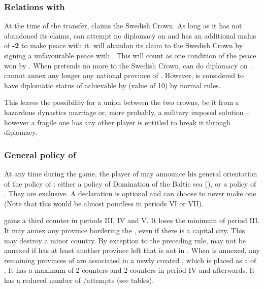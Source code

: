 \subsubsection{Relations with }
\label{chSpecific:Sweden:Denmark}
 At the time of the transfer,
 claims the Swedish Crown. As long as it has not
abandoned its claims, \SUE can attempt no diplomacy on 
and has an additional malus of {\bf -2} to make peace with it.
\aparag {} will abandon its claim to the Swedish Crown by
signing a unfavourable peace with \SUE. This will count as one condition
of the peace won by \SUE.
\bparag When  pretends no more to the Swedish Crown, \SUE
can do diplomacy on . 
\bparag \SUE cannot annex any longer any national province of .
However,  is considered to have diplomatic status of \ANNEXION 
achievable by \SUE (value of 10) by normal rules.
\begin{designnote}
This leaves the possibility for a union between the two crowns, be it from a
hazardous dynastics marriage or, more probably, a military imposed solution 
-- however a fragile one has any other player is entitled to break it through diplomacy.
\end{designnote}
\subsubsection{General policy of }
\aparag At any time during the game, the player of \SUE may announce his
general orientation of the policy of \SUE: either a policy of Domination
of the Baltic sea (), or a policy of
. They are exclusive. A declaration is
optional and \SUE can choose to never make one (Note that this would be
almost pointless in periods VI or VII).

\label{chSpecific:Sweden:DMB}
\bparag \SUE gains a third \ARMY counter in periods III, IV and V. It
loses the minimum \LeaderE of period III.
\bparag It may annex any province bordering the , even
if there is a capital city. This may destroy a minor country.
\bparag By exception to the preceding rule,  may not
be annexed if  has at least another province left that is
not in . When  is annexed, any
remaining provinces of  are associated in a newly created
, which is placed as a \VASSAL of \SUE. 
\bparag It has a maximum of 2 \TP counters and 2 \COL counters in period
IV and afterwards.
\bparag It has a reduced number of \TP/\COL attempts (see tables).

